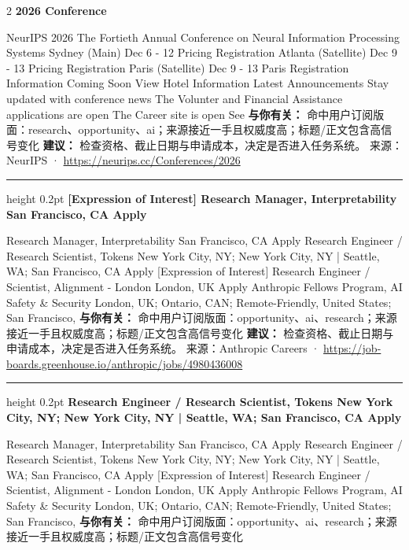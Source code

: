 \documentclass[10.5pt]{ctexart}
\begin{document}
\begin{multicols}{2}
{\large\bfseries 2026 Conference}\par
NeurIPS 2026 The Fortieth Annual Conference on Neural Information Processing Systems Sydney (Main) Dec 6 - 12 Pricing Registration Atlanta (Satellite) Dec 9 - 13 Pricing Registration Paris (Satellite) Dec 9 - 13 Paris Registration Information Coming Soon View Hotel Information Latest Announcements Stay updated with conference news The Volunter and Financial Assistance applications are open The Career site is open See
\textbf{与你有关：} 命中用户订阅版面：research、opportunity、ai；来源接近一手且权威度高；标题/正文包含高信号变化
\textbf{建议：} 检查资格、截止日期与申请成本，决定是否进入任务系统。
{\footnotesize\color{ormuted} 来源：NeurIPS · \url{https://neurips.cc/Conferences/2026}}
\vspace{2mm}
\hrule height 0.2pt
\vspace{2mm}
{\large\bfseries [Expression of Interest] Research Manager, Interpretability San Francisco, CA Apply}\par
[Expression of Interest] Research Manager, Interpretability San Francisco, CA Apply Research Engineer / Research Scientist, Tokens New York City, NY; New York City, NY | Seattle, WA; San Francisco, CA Apply [Expression of Interest] Research Engineer / Scientist, Alignment - London London, UK Apply Anthropic Fellows Program, AI Safety \& Security London, UK; Ontario, CAN; Remote-Friendly, United States; San Francisco, 
\textbf{与你有关：} 命中用户订阅版面：opportunity、ai、research；来源接近一手且权威度高；标题/正文包含高信号变化
\textbf{建议：} 检查资格、截止日期与申请成本，决定是否进入任务系统。
{\footnotesize\color{ormuted} 来源：Anthropic Careers · \url{https://job-boards.greenhouse.io/anthropic/jobs/4980436008}}
\vspace{2mm}
\hrule height 0.2pt
\vspace{2mm}
{\large\bfseries Research Engineer / Research Scientist, Tokens New York City, NY; New York City, NY | Seattle, WA; San Francisco, CA Apply}\par
[Expression of Interest] Research Manager, Interpretability San Francisco, CA Apply Research Engineer / Research Scientist, Tokens New York City, NY; New York City, NY | Seattle, WA; San Francisco, CA Apply [Expression of Interest] Research Engineer / Scientist, Alignment - London London, UK Apply Anthropic Fellows Program, AI Safety \& Security London, UK; Ontario, CAN; Remote-Friendly, United States; San Francisco, 
\textbf{与你有关：} 命中用户订阅版面：opportunity、ai、research；来源接近一手且权威度高；标题/正文包含高信号变化

\end{multicols}
\end{document}
